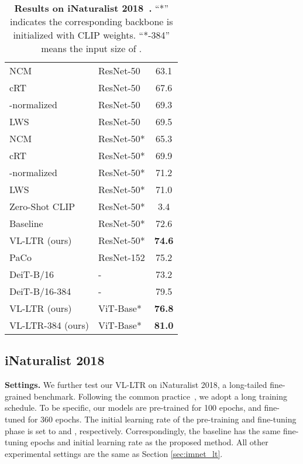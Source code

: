 \documentclass[runningheads]{llncs}
\begin{document}
\begin{table}[t]
\begin{tabular}{l|l|c}
	NCM \cite{kang2019decoupling} & ResNet-50 & 63.1\\
	cRT \cite{kang2019decoupling} & ResNet-50 & 67.6\\
	-normalized \cite{kang2019decoupling} & ResNet-50 & 69.3 \\
	LWS \cite{kang2019decoupling} & ResNet-50 & 69.5 \\
	\hline
	NCM \cite{kang2019decoupling} & ResNet-50* & 65.3 \\
	cRT \cite{kang2019decoupling} & ResNet-50* & 69.9 \\
	-normalized \cite{kang2019decoupling} & ResNet-50* &  71.2 \\
	LWS \cite{kang2019decoupling} & ResNet-50* & 71.0\\
	Zero-Shot CLIP \cite{clip} & ResNet-50* &   3.4  \\
	Baseline & ResNet-50* & 72.6 \\
	\rowcolor{mygray}
	VL-LTR (ours) & ResNet-50* & \bf{74.6} \\
	\hline
	PaCo \cite{cui2021parametric} & ResNet-152 & 75.2 \\
	DeiT-B/16~\cite{touvron2020training} & - & 73.2 \\
	DeiT-B/16-384~\cite{touvron2020training} & - & 79.5 \\
	\rowcolor{mygray}
	VL-LTR (ours) & ViT-Base* & \textbf{76.8} \\
	\rowcolor{mygray}
	VL-LTR-384 (ours) & ViT-Base* & \textbf{81.0} \\
	
\end{tabular}
 \caption{\textbf{Results on iNaturalist 2018~\cite{van2018inaturalist}.}
``*'' indicates the corresponding backbone is initialized with CLIP weights.
    ``*-384'' means the input size of .}
    \label{tab:inat18}
\end{table}

\subsection{iNaturalist 2018}

\noindent\textbf{Settings.} We further test our VL-LTR on iNaturalist 2018, a long-tailed fine-grained benchmark. Following the common practice~\cite{touvron2020training},
we adopt a long training schedule. To be specific, our models are pre-trained for 100 epochs, and fine-tuned for 360 epochs.
The initial learning rate of the pre-training and fine-tuning phase is set to  and , respectively.
Correspondingly, the baseline has the same fine-tuning epochs and initial learning rate as the proposed method.
All other experimental settings are the same as Section \ref{sec:imnet_lt}.
\end{document}
